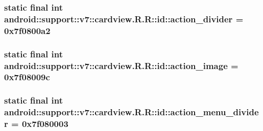\hypertarget{classandroid_1_1support_1_1v7_1_1cardview_1_1_r_1_1id_408bc2076fc8d31300967ce92fdaf71a}{
\subsubsection[{action\_\-divider}]{\setlength{\rightskip}{0pt plus 5cm}static final int android::support::v7::cardview.R.R::id::action\_\-divider = 0x7f0800a2}}
\label{classandroid_1_1support_1_1v7_1_1cardview_1_1_r_1_1id_408bc2076fc8d31300967ce92fdaf71a}


\hypertarget{classandroid_1_1support_1_1v7_1_1cardview_1_1_r_1_1id_18dd7e28de6df59118c661fbd813cd2d}{
\subsubsection[{action\_\-image}]{\setlength{\rightskip}{0pt plus 5cm}static final int android::support::v7::cardview.R.R::id::action\_\-image = 0x7f08009c}}
\label{classandroid_1_1support_1_1v7_1_1cardview_1_1_r_1_1id_18dd7e28de6df59118c661fbd813cd2d}


\hypertarget{classandroid_1_1support_1_1v7_1_1cardview_1_1_r_1_1id_6eedccea51e4de2401c4890b9e737bc9}{
\subsubsection[{action\_\-menu\_\-divider}]{\setlength{\rightskip}{0pt plus 5cm}static final int android::support::v7::cardview.R.R::id::action\_\-menu\_\-divider = 0x7f080003}}
\label{classandroid_1_1support_1_1v7_1_1cardview_1_1_r_1_1id_6eedccea51e4de2401c4890b9e737bc9}


